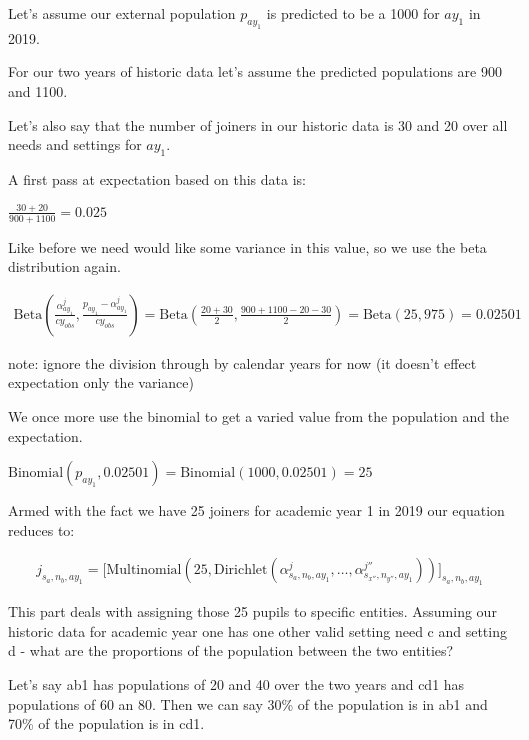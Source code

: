 \documentclass[margin=5mm]{article}
\begin{document}
Let's assume our external population $p_{ay_1}$ is predicted to be a
1000 for $ay_1$ in 2019.

For our two years of historic data let's assume the predicted
populations are 900 and 1100.

Let's also say that the number of joiners in our historic data is 30
and 20 over all needs and settings for $ay_1$.

A first pass at expectation based on this data is:

$\frac{30+20}{900 + 1100} = 0.025$

Like before we need would like some variance in this value, so we use
the beta distribution again.

\begin{equation*}
  \begin{split}
\text{Beta}(\frac{\alpha^j_{ay_1}}{cy_{obs}},\frac{p_{ay_1}
  -\alpha^j_{ay_1}}{cy_{obs}}) = \text{Beta}(\frac{20+30}{2},\frac{900
  + 1100 - 20 - 30}{2}) = \text{Beta}(25,975) = 0.02501
  \end{split}
\end{equation*}

note: ignore the division through by calendar years for now (it
doesn't effect expectation only the variance)

We once more use the binomial to get a varied value from the
population and the expectation.

$\text{Binomial}(p_{ay_1}, 0.02501) = \text{Binomial}(1000, 0.02501) = 25$

Armed with the fact we have 25 joiners for academic
year 1 in 2019 our equation reduces to:

\begin{equation*}
  \begin{split}
j_{s_a,n_b,ay_1} = \bigg[\text{Multinomial}(25, \text{Dirichlet}(\alpha^{j}_{s_a,n_b,ay_1}, \dots
, \alpha^{j''}_{s_{x''},n_{y''},ay_{1}}))\bigg]_{s_a,n_b,ay_1}
  \end{split}
\end{equation*}

This part deals with assigning those 25 pupils to specific entities.
Assuming our historic data for academic year one has one other valid
setting need c and setting d - what are the proportions of the
population between the two entities?

Let's say ab1 has populations of 20 and 40 over the two years and cd1
has populations of 60 an 80.  Then we can say 30\% of the population
is in ab1 and 70\% of the population is in cd1.
\end{document}
